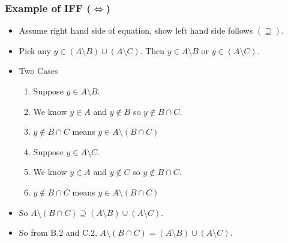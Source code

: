 \documentclass[aspectratio=169]{beamer}
\numberwithin{equation}{section}
\begin{document}
\begin{frame}
\frametitle{Example of IFF ($\iff$)}
\begin{itemize}

\item[C)] Assume right hand side of equation, show left hand side follows $(\supseteq)$.\pause
\item[] Pick any $y\in (A \setminus B) \cup (A \setminus C)$.  Then $y\in A \setminus B$ or $y \in (A\setminus C)$.\pause
\item[C.1)] Two Cases\pause
\begin{enumerate}
\item Suppose $y\in A \setminus B$. \pause
\item[] We know $y\in A$ and $y\notin B$ so $y\notin B\cap C$. \pause
\item[] $y\notin B\cap C$ means $y \in A \setminus (B\cap C)$\pause
\item Suppose $y\in A \setminus C$. \pause
\item[] We know $y\in A$ and $y\notin C$ so $y\notin B\cap C$. \pause
\item[] $y\notin B\cap C$ means $y \in A \setminus (B\cap C)$\pause
\end{enumerate}
\item[C.2)] So $A \setminus (B \cap C)\supseteq(A \setminus B) \cup (A \setminus C).$
\item[D)] So from B.2 and C.2, $A \setminus (B \cap C)=(A \setminus B) \cup (A \setminus C).$
\end{itemize}

\end{frame}
\end{document}
